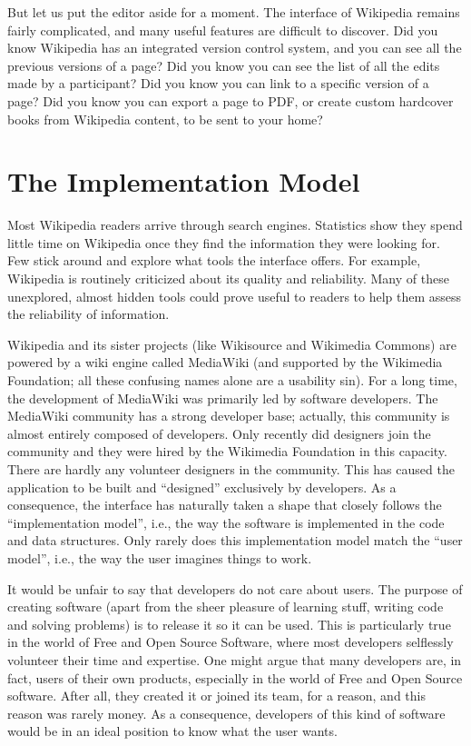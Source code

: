 But let us put the editor aside for a moment. The interface of Wikipedia remains
fairly complicated, and many useful features are difficult to discover. Did you
know Wikipedia has an integrated version control system, and you can see all
the previous versions of a page? Did you know you can see the list of all the
edits made by a participant? Did you know you can link to a specific version
of a page? Did you know you can export a page to PDF, or create custom
hardcover books from Wikipedia content, to be sent to your home?

\section*{The Implementation Model}

Most Wikipedia readers arrive through search engines. Statistics show they spend
little time on Wikipedia once they find the information they were looking for.
Few stick around and explore what tools the interface offers. For example,
Wikipedia is routinely criticized about its quality and reliability. Many of
these unexplored, almost hidden tools could prove useful to readers to help them
assess the reliability of information.

Wikipedia and its sister projects (like Wikisource and Wikimedia Commons)
are powered by a wiki engine called MediaWiki
(and supported by the Wikimedia Foundation; all these confusing names alone are
a usability sin). For a long time, the development of MediaWiki was primarily
led by software developers. The MediaWiki community has a strong developer base;
actually, this community is almost entirely composed of developers. Only
recently did designers join the community and they were hired by the Wikimedia
Foundation in this capacity. There are hardly any volunteer designers in the
community. This has caused the application to be built and ``designed''
exclusively by developers. As a consequence, the interface has naturally taken a
shape that closely follows the ``implementation model'', i.e., the way the
software is implemented in the code and data structures. Only rarely does this
implementation model match the ``user model'', i.e., the way the user imagines
things to work.

It would be unfair to say that developers do not care about users. The purpose
of creating software (apart from the sheer pleasure of learning stuff,
writing code and solving problems) is to release it so it can be used. This is
particularly true in the world of Free and Open Source Software, where most
developers selflessly volunteer their time and expertise. One might argue that
many developers are, in fact, users of their own products, especially in the
world of Free and Open Source software. After all, they created it or joined
its team, for a reason, and this reason was rarely money. As a consequence,
developers of this kind of software would be in an ideal position to know what
the user wants.


